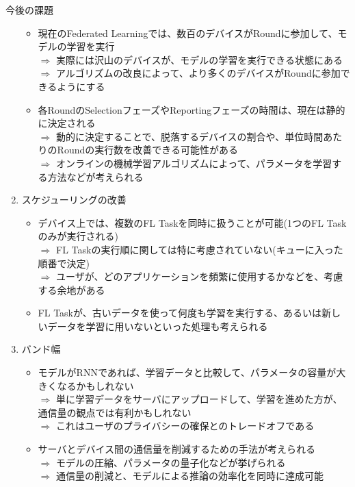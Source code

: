 \documentclass[dvipdfmx,notheorems,t]{beamer}
\begin{document}
\begin{frame}{今後の課題}
\begin{enumerate}
\begin{itemize}
		\item 現在のFederated Learningでは、数百のデバイスがRoundに参加して、モデルの学習を実行 \\
		$\Rightarrow$ 実際には沢山のデバイスが、モデルの学習を実行できる状態にある \\
		$\Rightarrow$ アルゴリズムの改良によって、より多くのデバイスがRoundに参加できるようにする
		\newline
		
		\item 各RoundのSelectionフェーズやReportingフェーズの時間は、現在は静的に決定される \\
		$\Rightarrow$ 動的に決定することで、脱落するデバイスの割合や、単位時間あたりのRoundの実行数を改善できる可能性がある \\
		$\Rightarrow$ オンラインの機械学習アルゴリズムによって、パラメータを学習する方法などが考えられる
	\end{itemize}
	
	\framebreak
	
	\item スケジューリングの改善
	\begin{itemize}
		\item デバイス上では、複数のFL Taskを同時に扱うことが可能(1つのFL Taskのみが実行される) \\
		$\Rightarrow$ FL Taskの実行順に関しては特に考慮されていない(キューに入った順番で決定) \\
		$\Rightarrow$ ユーザが、どのアプリケーションを頻繁に使用するかなどを、考慮する余地がある
		\newline
		
		\item FL Taskが、古いデータを使って何度も学習を実行する、あるいは新しいデータを学習に用いないといった処理も考えられる
	\end{itemize}
	
	\framebreak
	
	\item バンド幅
	\begin{itemize}
		\item モデルがRNNであれば、学習データと比較して、パラメータの容量が大きくなるかもしれない \\
		$\Rightarrow$ 単に学習データをサーバにアップロードして、学習を進めた方が、通信量の観点では有利かもしれない \\
		$\Rightarrow$ これはユーザのプライバシーの確保とのトレードオフである
		\newline
		
		\item サーバとデバイス間の通信量を削減するための手法が考えられる \\
		$\Rightarrow$ モデルの圧縮、パラメータの量子化などが挙げられる \\
		$\Rightarrow$ 通信量の削減と、モデルによる推論の効率化を同時に達成可能
	\end{itemize}
	

\end{enumerate}
\end{frame}
\end{document}
